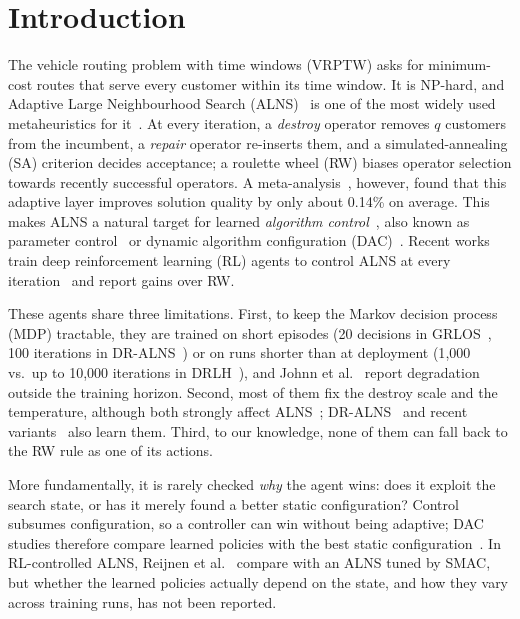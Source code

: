 \section{Introduction}\label{sec:intro}
The vehicle routing problem with time windows (VRPTW) asks for minimum-cost routes that
serve every customer within its time window. It is NP-hard, and Adaptive Large
Neighbourhood Search (ALNS)~\cite{ropke2006alns,pisinger2007general} is one of the most widely
used metaheuristics for it~\cite{mara2022survey}. At every iteration, a \emph{destroy} operator removes $q$
customers from the incumbent, a \emph{repair} operator re-inserts them, and a
simulated-annealing (SA) criterion decides acceptance; a roulette wheel (RW) biases
operator selection towards recently successful operators. A
meta-analysis~\cite{turkes2021meta}, however, found that this adaptive layer improves
solution quality by only about 0.14\% on average. This makes ALNS a natural target for
learned \emph{algorithm control}~\cite{karimi2022survey}, also known as parameter
control~\cite{eiben1999control} or dynamic algorithm configuration
(DAC)~\cite{biedenkapp2020dac,adriaensen2022dac}. Recent works train deep
reinforcement learning (RL) agents to control ALNS at every
iteration~\cite{kallestad2023,reijnen2024,johnn2024grlos,wang2025ppoalns} and report
gains over RW.

These agents share three limitations. First, to keep the Markov decision process (MDP)
tractable, they are trained on short episodes (20 decisions in
GRLOS~\cite{johnn2024grlos}, 100 iterations in DR-ALNS~\cite{reijnen2024}) or on runs
shorter than at deployment (1{,}000 vs.\ up to 10{,}000 iterations in
DRLH~\cite{kallestad2023}), and Johnn et al.~\cite{johnn2024grlos} report degradation
outside the training horizon. Second, most of them fix the destroy scale and the temperature, although both
strongly affect ALNS~\cite{ropke2006alns,santini2018}; DR-ALNS~\cite{reijnen2024} and
recent variants~\cite{cherrered2026roadef,xie2025pod} also learn them. Third, to our knowledge, none of them can fall
back to the RW rule as one of its actions.

More fundamentally, it is rarely checked \emph{why} the agent wins: does it exploit the
search state, or has it merely found a better static configuration? Control subsumes
configuration, so a controller can win without being adaptive; DAC studies therefore
compare learned policies with the best static
configuration~\cite{biedenkapp2020dac,eimer2021dacbench}. In RL-controlled ALNS,
Reijnen et al.~\cite{reijnen2024} compare with an ALNS tuned by SMAC, but whether the
learned policies actually depend on the state, and how they vary across training runs,
has not been reported.

